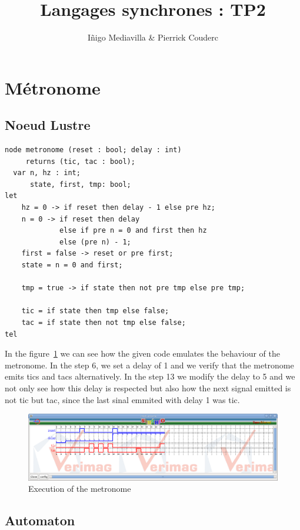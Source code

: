 \documentclass{article}
\title{Langages synchrones : TP2}
\author{I\~{n}igo Mediavilla \& Pierrick Couderc}
\begin{document}
\maketitle

\section{Métronome}


\subsection{Noeud Lustre}

\begin{verbatim}
node metronome (reset : bool; delay : int) 
     returns (tic, tac : bool);
  var n, hz : int;
      state, first, tmp: bool;
let
    hz = 0 -> if reset then delay - 1 else pre hz;
    n = 0 -> if reset then delay
             else if pre n = 0 and first then hz
             else (pre n) - 1;
    first = false -> reset or pre first;
    state = n = 0 and first;

    tmp = true -> if state then not pre tmp else pre tmp;
    
    tic = if state then tmp else false;
    tac = if state then not tmp else false;
tel
\end{verbatim}


In the figure~\ref{trace-metronome-1} we can see how the given code
emulates the behaviour of the metronome. In the step 6, we set a
delay of 1 and we verify that the metronome emits tics and tacs
alternatively. In the step 13 we modify the delay to 5 and we not
only see how this delay is respected but also how the next signal
emitted is not tic but tac, since the last sinal emmited with delay
1 was tic.

\begin{figure}[!ht]
\label{trace-metronome-1}
\caption{Execution of the metronome}
\includegraphics [width=1.2\textwidth, natwidth=750,natheight=600]{metronome_1.png}
\end{figure}

\subsection{Automaton}
\end{document}
